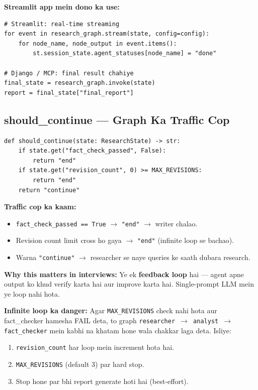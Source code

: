 \begin{codestorybox}
\textbf{Streamlit app mein dono ka use:}

\begin{lstlisting}[style=pythonstyle, caption={stream vs invoke in practice}]
# Streamlit: real-time streaming
for event in research_graph.stream(state, config=config):
    for node_name, node_output in event.items():
        st.session_state.agent_statuses[node_name] = "done"

# Django / MCP: final result chahiye
final_state = research_graph.invoke(state)
report = final_state["final_report"]
\end{lstlisting}
\end{codestorybox}

\subsection{should\_continue --- Graph Ka Traffic Cop}

\begin{codestorybox}
\begin{lstlisting}[style=pythonstyle, caption={Conditional edge logic}]
def should_continue(state: ResearchState) -> str:
    if state.get("fact_check_passed", False):
        return "end"
    if state.get("revision_count", 0) >= MAX_REVISIONS:
        return "end"
    return "continue"
\end{lstlisting}

\textbf{Traffic cop ka kaam:}
\begin{itemize}
\item \texttt{fact\_check\_passed == True} $\rightarrow$ \texttt{"end"} $\rightarrow$ writer chalao.
\item Revision count limit cross ho gaya $\rightarrow$ \texttt{"end"} (infinite loop se bachao).
\item Warna \texttt{"continue"} $\rightarrow$ researcher se naye queries ke saath dubara research.
\end{itemize}

\textbf{Why this matters in interviews:} Ye ek \textbf{feedback loop} hai --- agent apne output ko khud verify karta hai aur improve karta hai. Single-prompt LLM mein ye loop nahi hota.
\end{codestorybox}

\begin{warningbox}
\textbf{Infinite loop ka danger:} Agar \texttt{MAX\_REVISIONS} check nahi hota aur fact\_checker hamesha FAIL deta, to graph \texttt{researcher $\rightarrow$ analyst $\rightarrow$ fact\_checker} mein kabhi na khatam hone wala chakkar laga deta. Isliye:
\begin{enumerate}[label=\arabic*.]
\item \texttt{revision\_count} har loop mein increment hota hai.
\item \texttt{MAX\_REVISIONS} (default 3) par hard stop.
\item Stop hone par bhi report generate hoti hai (best-effort).
\end{enumerate}
\end{warningbox}


